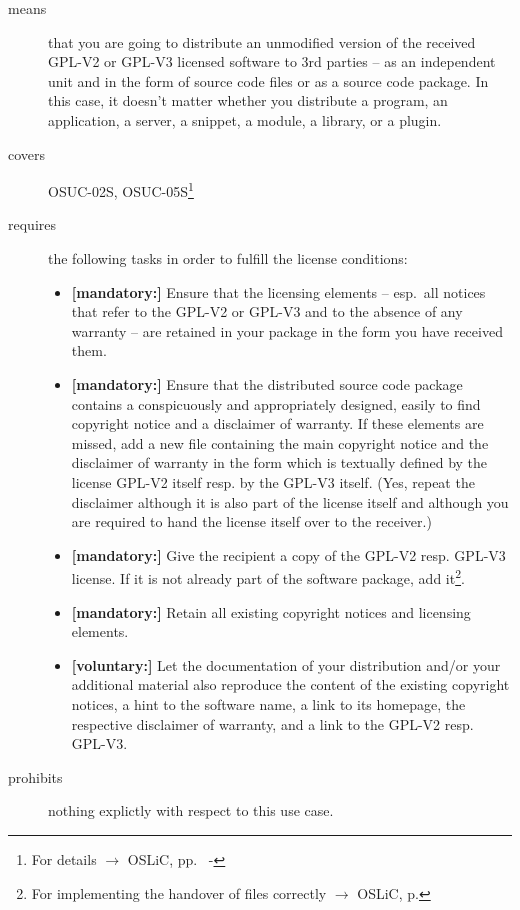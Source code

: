 \begin{description}

\item[means] that you are going to distribute an unmodified version of the
received GPL-V2 or GPL-V3 licensed software to 3rd parties -- as an independent
unit and in the form of source code files or as a source code package. In this
case, it doesn't matter whether you distribute a program, an application, a
server, a snippet, a module, a library, or a plugin.

\item[covers] OSUC-02S, OSUC-05S\footnote{For details $\rightarrow$
OSLiC, pp.\ \pageref{OSUC-02S-DEF} - \pageref{OSUC-05S-DEF}}

\item[requires] the following tasks in order to fulfill the license conditions:
\begin{itemize}
 
  \item \textbf{[mandatory:]} Ensure that the licensing elements -- esp.\ all
  notices that refer to the GPL-V2 or GPL-V3 and to the absence of any
  warranty -- are retained in your package in the form you have received them.

  \item \textbf{[mandatory:]} Ensure that the distributed source code package
  contains a conspicuously and appropriately designed, easily to find copyright
  notice and a disclaimer of warranty. If these elements are missed, add a new
  file containing the main copyright notice and the disclaimer of warranty in the
  form which is textually defined by the license GPL-V2 itself resp. by the
  GPL-V3 itself. (Yes, repeat the disclaimer although it is also part of the
  license itself and although you are required to hand the license itself over
  to the receiver.)
  
  \item \textbf{[mandatory:]} Give the recipient a copy of the GPL-V2 resp.
  GPL-V3 license. If it is not already part of the software package, add
  it\footnote{For implementing the handover of files correctly $\rightarrow$
  OSLiC, p. \pageref{DistributingFilesHint}}.

  \item \textbf{[mandatory:]} Retain all existing copyright notices and
  licensing elements.
    
  \item \textbf{[voluntary:]} Let the documentation of your distribution and/or
  your additional material also reproduce the content of the existing
  copyright notices, a hint to the software name, a link to its homepage,
  the respective disclaimer of warranty, and a link to the GPL-V2 resp.
  GPL-V3.

\end{itemize}

\item[prohibits] nothing explictly with respect to this use case.

\end{description}


